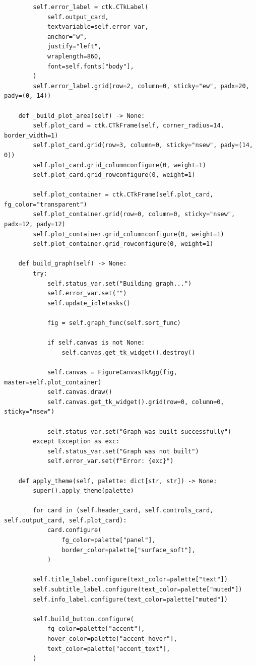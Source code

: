 \documentclass[12pt,a4paper]{article}
\begin{document}
\begin{verbatim}
        self.error_label = ctk.CTkLabel(
            self.output_card,
            textvariable=self.error_var,
            anchor="w",
            justify="left",
            wraplength=860,
            font=self.fonts["body"],
        )
        self.error_label.grid(row=2, column=0, sticky="ew", padx=20, pady=(0, 14))

    def _build_plot_area(self) -> None:
        self.plot_card = ctk.CTkFrame(self, corner_radius=14, border_width=1)
        self.plot_card.grid(row=3, column=0, sticky="nsew", pady=(14, 0))
        self.plot_card.grid_columnconfigure(0, weight=1)
        self.plot_card.grid_rowconfigure(0, weight=1)

        self.plot_container = ctk.CTkFrame(self.plot_card, fg_color="transparent")
        self.plot_container.grid(row=0, column=0, sticky="nsew", padx=12, pady=12)
        self.plot_container.grid_columnconfigure(0, weight=1)
        self.plot_container.grid_rowconfigure(0, weight=1)

    def build_graph(self) -> None:
        try:
            self.status_var.set("Building graph...")
            self.error_var.set("")
            self.update_idletasks()

            fig = self.graph_func(self.sort_func)

            if self.canvas is not None:
                self.canvas.get_tk_widget().destroy()

            self.canvas = FigureCanvasTkAgg(fig, master=self.plot_container)
            self.canvas.draw()
            self.canvas.get_tk_widget().grid(row=0, column=0, sticky="nsew")

            self.status_var.set("Graph was built successfully")
        except Exception as exc:
            self.status_var.set("Graph was not built")
            self.error_var.set(f"Error: {exc}")

    def apply_theme(self, palette: dict[str, str]) -> None:
        super().apply_theme(palette)

        for card in (self.header_card, self.controls_card, self.output_card, self.plot_card):
            card.configure(
                fg_color=palette["panel"],
                border_color=palette["surface_soft"],
            )

        self.title_label.configure(text_color=palette["text"])
        self.subtitle_label.configure(text_color=palette["muted"])
        self.info_label.configure(text_color=palette["muted"])

        self.build_button.configure(
            fg_color=palette["accent"],
            hover_color=palette["accent_hover"],
            text_color=palette["accent_text"],
        )


\end{verbatim}
\end{document}
